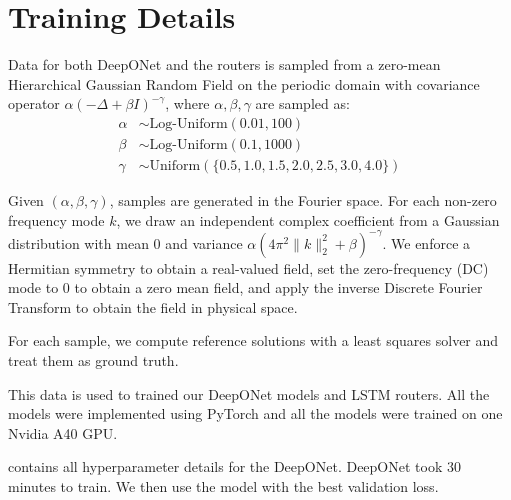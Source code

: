 \documentclass{article}
\begin{document}
\section{Training Details} \label{sec:training details}

Data for both DeepONet and the routers is sampled from a zero-mean Hierarchical Gaussian Random Field on the periodic domain with covariance operator $\alpha(- \Delta + \beta I)^{-\gamma}$, where $\alpha, \beta, \gamma$ are sampled as:
\begin{align*}
    \alpha &\sim \text{Log-Uniform}(0.01, 100)\\
    \beta &\sim \text{Log-Uniform}(0.1, 1000) \\
    \gamma &\sim \text{Uniform}\left(\{0.5, 1.0, 1.5, 2.0, 2.5, 3.0, 4.0\}\right)
\end{align*}

Given $(\alpha, \beta, \gamma)$, samples are generated in the Fourier space. For each non-zero frequency mode $k$, we draw an independent complex coefficient from a Gaussian distribution with mean 0 and variance $\alpha(4\pi^2 \|k\|^2_2 + \beta)^{-\gamma}$. We enforce a Hermitian symmetry to obtain a real-valued field, set the zero-frequency (DC) mode to $0$ to obtain a zero mean field, and apply the inverse Discrete Fourier Transform to obtain the field in physical space. 

For each sample, we compute reference solutions with a least squares solver and treat them as ground truth. 

This data is used to trained our DeepONet models and LSTM routers. All the models were implemented using PyTorch and all the models were trained on one Nvidia A40 GPU.

 contains all hyperparameter details for the DeepONet. DeepONet took 30 minutes to train. We then use the model with the best validation loss. 
\end{document}

